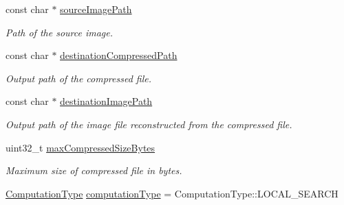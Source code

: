 \begin{DoxyCompactItemize}
\item 
const char $\ast$ \hyperlink{structlossycompressor_1_1_compressor_1_1_args_a2cb45124864a302e76798205a80b4e42}{source\+Image\+Path}\hypertarget{structlossycompressor_1_1_compressor_1_1_args_a2cb45124864a302e76798205a80b4e42}{}\label{structlossycompressor_1_1_compressor_1_1_args_a2cb45124864a302e76798205a80b4e42}

\begin{DoxyCompactList}\small\item\em Path of the source image. \end{DoxyCompactList}\item 
const char $\ast$ \hyperlink{structlossycompressor_1_1_compressor_1_1_args_a07d888c22c98877258a86ab6f3a81cbf}{destination\+Compressed\+Path}\hypertarget{structlossycompressor_1_1_compressor_1_1_args_a07d888c22c98877258a86ab6f3a81cbf}{}\label{structlossycompressor_1_1_compressor_1_1_args_a07d888c22c98877258a86ab6f3a81cbf}

\begin{DoxyCompactList}\small\item\em Output path of the compressed file. \end{DoxyCompactList}\item 
const char $\ast$ \hyperlink{structlossycompressor_1_1_compressor_1_1_args_a66e5c194211355e8bd431c075301f2bd}{destination\+Image\+Path}\hypertarget{structlossycompressor_1_1_compressor_1_1_args_a66e5c194211355e8bd431c075301f2bd}{}\label{structlossycompressor_1_1_compressor_1_1_args_a66e5c194211355e8bd431c075301f2bd}

\begin{DoxyCompactList}\small\item\em Output path of the image file reconstructed from the compressed file. \end{DoxyCompactList}\item 
uint32\+\_\+t \hyperlink{structlossycompressor_1_1_compressor_1_1_args_a9d2e5cd2737fdcffb1798d64899bf8b1}{max\+Compressed\+Size\+Bytes}\hypertarget{structlossycompressor_1_1_compressor_1_1_args_a9d2e5cd2737fdcffb1798d64899bf8b1}{}\label{structlossycompressor_1_1_compressor_1_1_args_a9d2e5cd2737fdcffb1798d64899bf8b1}

\begin{DoxyCompactList}\small\item\em Maximum size of compressed file in bytes. \end{DoxyCompactList}\item 
\hyperlink{classlossycompressor_1_1_compressor_a17846b94a7f3efe3f0a80b3b28ec46f0}{Computation\+Type} \hyperlink{structlossycompressor_1_1_compressor_1_1_args_af299abdc3a9ad17d9ddfc84b3d9cab6a}{computation\+Type} = Computation\+Type\+::\+L\+O\+C\+A\+L\+\_\+\+S\+E\+A\+R\+CH\hypertarget{structlossycompressor_1_1_compressor_1_1_args_af299abdc3a9ad17d9ddfc84b3d9cab6a}{}\label{structlossycompressor_1_1_compressor_1_1_args_af299abdc3a9ad17d9ddfc84b3d9cab6a}


\end{DoxyCompactItemize}
